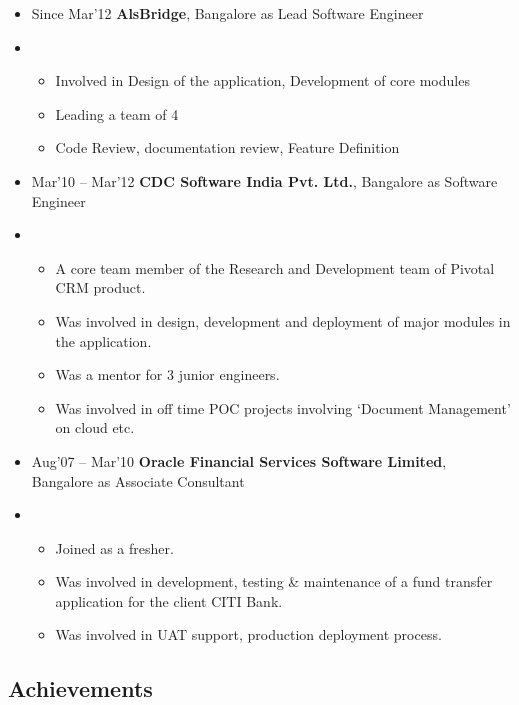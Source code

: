 \documentclass[]{article}
\begin{document}
\begin{itemize}
\item
  Since Mar'12 \textbf{AlsBridge}, Bangalore as Lead Software Engineer
\item
  \begin{itemize}
  \itemsep1pt\parskip0pt
  \item
    Involved in Design of the application, Development of core modules
  \item
    Leading a team of 4
  \item
    Code Review, documentation review, Feature Definition
  \end{itemize}
\item
  Mar'10 -- Mar'12 \textbf{CDC Software India Pvt. Ltd.}, Bangalore as
  Software Engineer
\item
  \begin{itemize}
  \itemsep1pt\parskip0pt
  \item
    A core team member of the Research and Development team of Pivotal
    CRM product.
  \item
    Was involved in design, development and deployment of major modules
    in the application.
  \item
    Was a mentor for 3 junior engineers.
  \item
    Was involved in off time POC projects involving `Document
    Management' on cloud etc.
  \end{itemize}
\item
  Aug'07 -- Mar'10 \textbf{Oracle Financial Services Software Limited},
  Bangalore as Associate Consultant
\item
  \begin{itemize}
  \itemsep1pt\parskip0pt
  \item
    Joined as a fresher.
  \item
    Was involved in development, testing \& maintenance of a fund
    transfer application for the client CITI Bank.
  \item
    Was involved in UAT support, production deployment process.
  \end{itemize}
\end{itemize}

\subsection{Achievements}\label{achievements}
\end{document}
